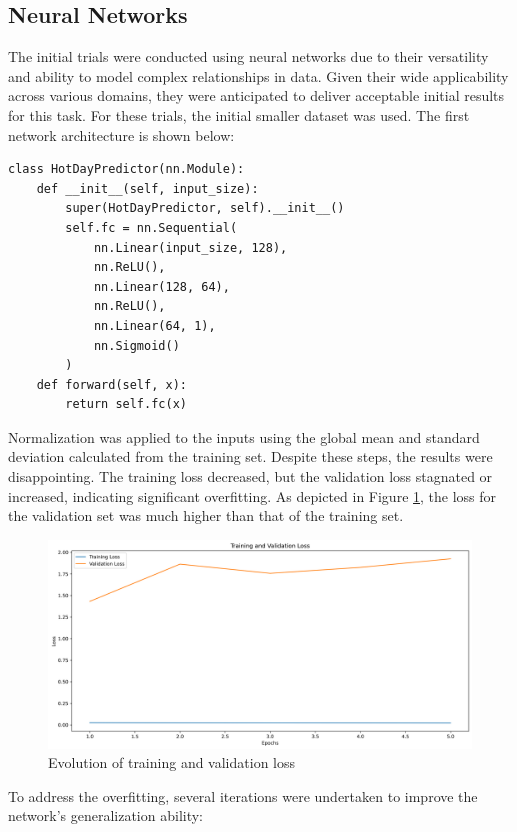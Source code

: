 \documentclass[8pt,a4paper]{article}
\begin{document}
\subsection{Neural Networks}
The initial trials were conducted using neural networks due to their versatility and ability to model complex relationships in data. Given their wide applicability across various domains, they were anticipated to deliver acceptable initial results for this task. For these trials, the initial smaller dataset was used. The first network architecture is shown below:
\begin{lstlisting}
class HotDayPredictor(nn.Module):
    def __init__(self, input_size):
        super(HotDayPredictor, self).__init__()
        self.fc = nn.Sequential(
            nn.Linear(input_size, 128),
            nn.ReLU(),
            nn.Linear(128, 64),
            nn.ReLU(),
            nn.Linear(64, 1),
            nn.Sigmoid()
        )
    def forward(self, x):
        return self.fc(x)
\end{lstlisting}
Normalization was applied to the inputs using the global mean and standard deviation calculated from the training set. Despite these steps, the results were disappointing. The training loss decreased, but the validation loss stagnated or increased, indicating significant overfitting. As depicted in Figure \ref{fig:baseline}, the loss for the validation set was much higher than that of the training set.
\begin{figure}[h]
    \centering
    \includegraphics[width=\textwidth]{../training_validation_loss_baseline.png}
    \caption{Evolution of training and validation loss}
    \label{fig:baseline}
\end{figure}
To address the overfitting, several iterations were undertaken to improve the network's generalization ability:
\end{document}
